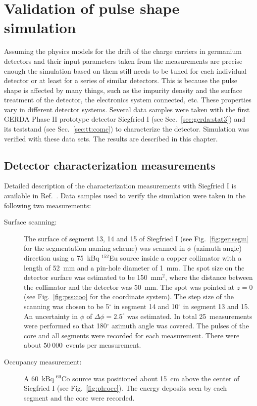 \chapter{Validation of pulse shape simulation}
\label{cha:psa}
Assuming the physics models\cite{miha, bart} for the drift of the charge carriers in germanium detectors and their input parameters taken from the measurements\cite{miha, bart} are precise enough the simulation based on them still needs to be tuned for each individual detector or at least for a series of similar detectors. This is because the pulse shape is affected by many things, such as the impurity density and the surface treatment of the detector, the electronics system connected, etc. These properties vary in different detector systems. Several data samples were taken with the first GERDA Phase II prototype detector Siegfried I (see Sec.~\ref{sec:gerda:stat3}) and its teststand (see Sec.~\ref{sec:tt:comc}) to characterize the detector. Simulation was verified with these data sets. The results are described in this chapter.

\section{Detector characterization measurements}
\label{sec:psa:char}
Detailed description of the characterization measurements with Siegfried I is available in Ref.~\cite{Sie07}. Data samples used to verify the simulation were taken in the following two measurements:
\begin{description}
\item[Surface scanning:] The surface of segment 13, 14 and 15 of Siegfried I (see Fig.~\ref{fig:ger:segm} for the segmentation naming scheme) was scanned in $\phi$ (azimuth angle) direction using a 75~kBq $^{152}$Eu source inside a copper collimator with a length of 52~mm and a pin-hole diameter of 1~mm. The spot size on the detector surface was estimated to be 150~mm$^{2}$, where the distance between the collimator and the detector was 50~mm. The spot was pointed at $z = 0$ (see Fig.~\ref{fig:pss:coo} for the coordinate system). The step size of the scanning was chosen to be 5$^{\circ}$ in segment 14 and 10$^{\circ}$ in segment 13 and 15. An uncertainty in $\phi$ of $\Delta \phi=2.5^{\circ}$ was estimated. In total 25~measurements were performed so that 180$^{\circ}$ azimuth angle was covered. The pulses of the core and all segments were recorded for each measurement. There were about $50\ 000$~events per measurement.
\item[Occupancy measurement:] A 60~kBq $^{60}$Co source was positioned about 15~cm above the center of Siegfried I (see Fig.~\ref{fig:ph:occ}). The energy deposits seen by each segment and the core were recorded.
\end{description}


